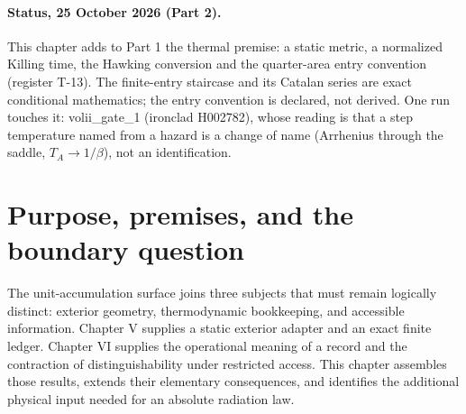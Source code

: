 \begin{abstract}
The completed boundary connects exterior geometry, finite thermodynamics, and accessible records. This chapter derives the surface gravity and first law under the explicitly inherited metric, temperature, and quarter-area premises; develops exact finite-entry transitions, their Catalan expansion, and conditional detailed balance; and separates thermal occupation from an absolute emission rate. The retained Si29 calculation is reformulated as a Hessian-level obstruction to scalar area--information proportionality, while its entropy--area pair provides local coordinates on the specified two-parameter source family. New analytic checks clarify finite-capacity errors, transmitted count fluctuations, entropy balance, and the distinction between a causal horizon and a material surface. The remaining physical joins are stated as testable tasks: a source-selected boundary response, energy and clock calibration, species-resolved dynamics, a certified information map, and consistency with compact-surface observations. No new native source execution or absolute luminosity is claimed.
\end{abstract}

\paragraph*{Status, 25 October 2026 (Part 2).} This chapter adds to Part 1 the thermal premise: a static metric, a normalized Killing time, the Hawking conversion and the quarter-area entry convention (register T-13). The finite-entry staircase and its Catalan series are exact conditional mathematics; the entry convention is declared, not derived. One run touches it: volii\_gate\_1 (ironclad H002782), whose reading is that a step temperature named from a hazard is a change of name (Arrhenius through the saddle, $T_A\to 1/\beta$), not an identification.


\section{Purpose, premises, and the boundary question}
The unit-accumulation surface joins three subjects that must remain logically distinct: exterior geometry, thermodynamic bookkeeping, and accessible information. Chapter V supplies a static exterior adapter and an exact finite ledger. Chapter VI supplies the operational meaning of a record and the contraction of distinguishability under restricted access. This chapter assembles those results, extends their elementary consequences, and identifies the additional physical input needed for an absolute radiation law.

